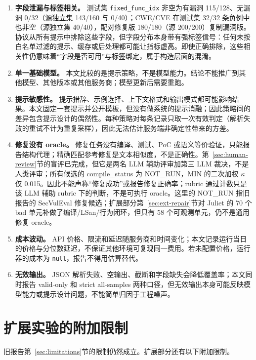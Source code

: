\documentclass[conference]{IEEEtran}
\begin{document}
\begin{enumerate}
    \item \textbf{字段泄漏与标签相关。} 测试集 \texttt{fixed\_func\_idx} 非空为有漏洞 115/128、无漏洞 0/32（源独立集 143/160 与 0/40）；CWE/CVE 在测试集 32/32 条负例中也非空（源独立集 40/40），配对修复版 180/180（源 200/200）复制漏洞版。协议从所有提示中排除这些字段，但字段分布本身带有强标签信号：任何未按白名单过滤的提示、缓存或后处理都可能让指标虚高。即使正确排除，这些相关性仍意味着“字段是否可用”与标签绑定，属于构造层面的混淆。
    \item \textbf{单一基础模型。} 本文比较的是提示策略，不是模型能力。结论不能推广到其他模型、其他版本或其他服务商；模型更新后需要重跑。
    \item \textbf{提示敏感性。} 提示措辞、示例选择、上下文格式和输出模式都可能影响结果。本文固定一套提示并公开模板，但没有做系统的提示消融；因此策略间的差异包含提示设计的偶然性。每种策略对每条记录只取一次有效判定（解析失败的重试不计为重复采样），因此无法估计服务端非确定性带来的方差。
    \item \textbf{修复没有 oracle。} 修复任务没有编译、测试、PoC 或语义等价验证，只能报告结构代理；精确匹配参考修复是文本相似度，不是正确性。第~\ref{sec:human-review}节的盲评已完成，但它是两名 LLM 辅助评审加第三 LLM 裁决，不是人类评审；所有候选的 compile\_status 为 NOT\_RUN，MIN 的二次加权 $\kappa$ 仅 0.015。因此不能声称“修复成功”或报告修复正确率；rubric 通过计数只是该 LLM 辅助 rubric 下的判断，不是可执行 oracle。这里的 NOT\_RUN 指旧报告的 SecVulEval 修复候选；扩展部分第~\ref{sec:ext-repair}节对 Juliet 的 70 个 bad 单元补做了编译/LSan/行为闭环，但只有 58 个可观测单元，仍不是通用修复 oracle。
    \item \textbf{成本波动。} API 价格、限流和延迟随服务商和时间变化；本文记录运行当日的价格与分位数延迟，不保证其他环境可复现同一费用。若未配置价格，运行器的成本为 \texttt{null}，报告不得用估算替代。
    \item \textbf{无效输出。} JSON 解析失败、空输出、截断和字段缺失会降低覆盖率；本文同时报告 valid-only 和 strict all-samples 两种口径，但无效输出本身可能反映模型能力或提示设计问题，不能简单归因于工程噪声。
\end{enumerate}

\section{扩展实验的附加限制}
\label{sec:ext-limitations}

旧报告第~\ref{sec:limitations}节的限制仍然成立。扩展部分还有以下附加限制。
\end{document}
